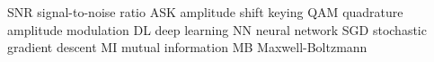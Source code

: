 \makeglossaries %
%
%
%
%
%
%
 {SNR} {signal-to-noise ratio}
%
 {ASK} {amplitude shift keying}
%
 {QAM} {quadrature amplitude modulation}
%
 {DL} {deep learning}
%
 {NN} {neural network}
%
 {SGD} {stochastic gradient descent}
%
 {MI} {mutual information}
%
 {MB} {Maxwell-Boltzmann}